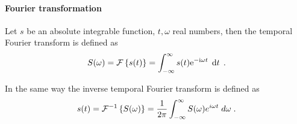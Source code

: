 \paragraph{Fourier transformation}
Let $s$ be an absolute integrable function, $t,\omega$ real numbers, then the
temporal Fourier transform is defined as\autocite{Bracewell2000}
%
\begin{equation}
    S(\omega) = \FT{s(t)} = \int^{\infty}_{-\infty} s(t) \E^{-\I\omega t}
    \; \df{t}
    \qp
    \label{eq:ft}
\end{equation}

In the same way the inverse temporal Fourier transform is defined as
%
\begin{equation}
    s(t) = \IFT{S(\omega)} = \frac{1}{2\pi} \int^{\infty}_{-\infty} S(\omega)
    e^{i\omega t} \; d\omega
    \qp
    \label{eq:ift}
\end{equation}
